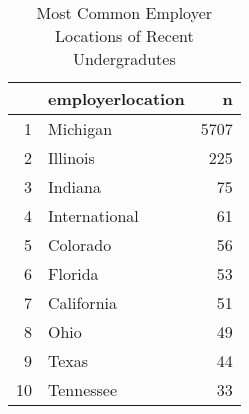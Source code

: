 \begin{table}[ht]
\centering
\begin{tabular}{rlr}
  \hline
 & employerlocation & n \\ 
  \hline
1 & Michigan & 5707 \\ 
  2 & Illinois & 225 \\ 
  3 & Indiana &  75 \\ 
  4 & International &  61 \\ 
  5 & Colorado &  56 \\ 
  6 & Florida &  53 \\ 
  7 & California &  51 \\ 
  8 & Ohio &  49 \\ 
  9 & Texas &  44 \\ 
  10 & Tennessee &  33 \\ 
   \hline
\end{tabular}
\caption{Most Common Employer Locations of Recent Undergradutes} 
\end{table}
